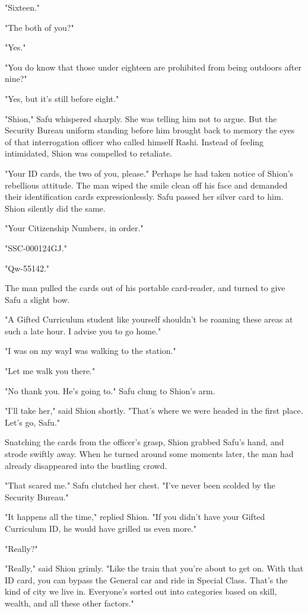 "Sixteen."

"The both of you?"

"Yes."

"You do know that those under eighteen are prohibited from being
outdoors after nine?"

"Yes, but it's still before eight."

"Shion," Safu whispered sharply. She was telling him not to argue. But
the Security Bureau uniform standing before him brought back to memory
the eyes of that interrogation officer who called himself Rashi. Instead
of feeling intimidated, Shion was compelled to retaliate.

"Your ID cards, the two of you, please." Perhaps he had taken notice of
Shion's rebellious attitude. The man wiped the smile clean off his face
and demanded their identification cards expressionlessly. Safu passed
her silver card to him. Shion silently did the same.

"Your Citizenship Numbers, in order."

"SSC-000124GJ."

"Qw-55142."

The man pulled the cards out of his portable card-reader, and turned to
give Safu a slight bow.

"A Gifted Curriculum student like yourself shouldn't be roaming these
areas at such a late hour. I advise you to go home."

"I was on my way\el I was walking to the station."

"Let me walk you there."

"No thank you. He's going to." Safu clung to Shion's arm.

"I'll take her," said Shion shortly. "That's where we were headed in the
first place. Let's go, Safu."

Snatching the cards from the officer's grasp, Shion grabbed Safu's hand,
and strode swiftly away. When he turned around some moments later, the
man had already disappeared into the bustling crowd.

"That scared me." Safu clutched her chest. "I've never been scolded by
the Security Bureau."

"It happens all the time," replied Shion. "If you didn't have your
Gifted Curriculum ID, he would have grilled us even more."

"Really?"

"Really," said Shion grimly. "Like the train that you're about to get
on. With that ID card, you can bypass the General car and ride in
Special Class. That's the kind of city we live in. Everyone's sorted out
into categories based on skill, wealth, and all these other factors."

